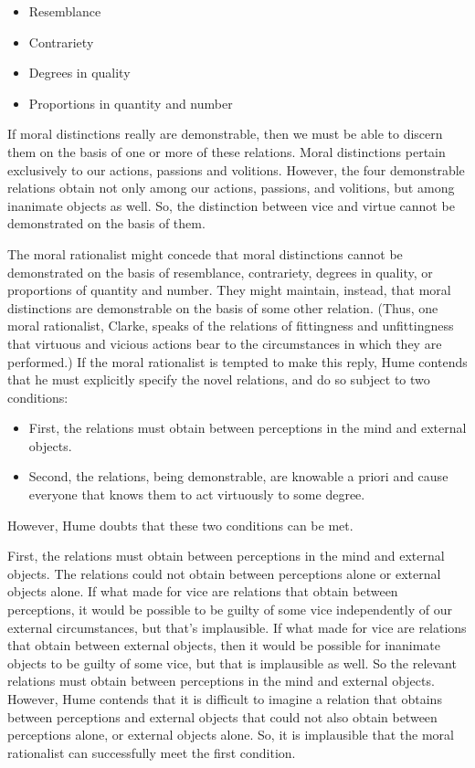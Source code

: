 \begin{itemize}
	\item Resemblance
	\item Contrariety
	\item Degrees in quality
	\item Proportions in quantity and number
\end{itemize}

If moral distinctions really are demonstrable, then we must be able to discern them on the basis of one or more of these relations. Moral distinctions pertain exclusively to our actions, passions and volitions. However, the four demonstrable relations obtain not only among our actions, passions, and volitions, but among inanimate objects as well. So, the distinction between vice and virtue cannot be demonstrated on the basis of them.

The moral rationalist might concede that moral distinctions cannot be demonstrated on the basis of resemblance, contrariety, degrees in quality, or proportions of quantity and number. They might maintain, instead, that moral distinctions are demonstrable on the basis of some other relation. (Thus, one moral rationalist, Clarke, speaks of the relations of fittingness and unfittingness that virtuous and vicious actions bear to the circumstances in which they are performed.) If the moral rationalist is tempted to make this reply, Hume contends that he must explicitly specify the novel relations, and do so subject to two conditions:

\begin{itemize}
	\item First, the relations must obtain between perceptions in the mind and external objects.
	\item Second, the relations, being demonstrable, are knowable a priori and cause everyone that knows them to act virtuously to some degree.
\end{itemize}

However, Hume doubts that these two conditions can be met.

First, the relations must obtain between perceptions in the mind and external objects. The relations could not obtain between perceptions alone or external objects alone. If what made for vice are relations that obtain between perceptions, it would be possible to be guilty of some vice independently of our external circumstances, but that's implausible. If what made for vice are relations that obtain between external objects, then it would be possible for inanimate objects to be guilty of some vice, but that is implausible as well. So the relevant relations must obtain between perceptions in the mind and external objects. However, Hume contends that it is difficult to imagine a relation that obtains between perceptions and external objects that could not also obtain between perceptions alone, or external objects alone. So, it is implausible that the moral rationalist can successfully meet the first condition.

